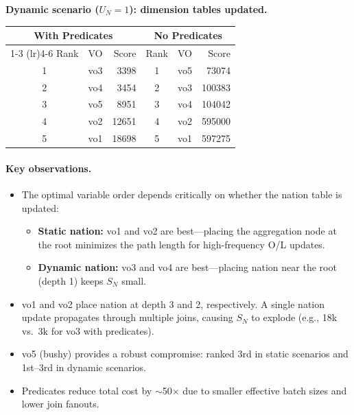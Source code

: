 \smallskip
\noindent\textbf{Dynamic scenario ($U_N = 1$): dimension tables updated.}
\begin{center}
\begin{tabular}{clrclr}
\toprule
\multicolumn{3}{c}{With Predicates} & \multicolumn{3}{c}{No Predicates} \\
\cmidrule(lr){1-3} \cmidrule(lr){4-6}
Rank & VO & Score & Rank & VO & Score \\
\midrule
1 & vo3 & 3398 & 1 & vo5 & 73074 \\
2 & vo4 & 3454 & 2 & vo3 & 100383 \\
3 & vo5 & 8951 & 3 & vo4 & 104042 \\
4 & vo2 & 12651 & 4 & vo2 & 595000 \\
5 & vo1 & 18698 & 5 & vo1 & 597275 \\
\bottomrule
\end{tabular}
\end{center}

\paragraph{Key observations.}
\begin{itemize}
\item The optimal variable order depends critically on whether the nation table is updated:
  \begin{itemize}
  \item \textbf{Static nation:} vo1 and vo2 are best---placing the aggregation node at the root minimizes the path length for high-frequency O/L updates.
  \item \textbf{Dynamic nation:} vo3 and vo4 are best---placing nation near the root (depth 1) keeps $S_N$ small.
  \end{itemize}
\item vo1 and vo2 place nation at depth 3 and 2, respectively. A single nation update propagates through multiple joins, causing $S_N$ to explode (e.g., 18k vs.\ 3k for vo3 with predicates).
\item vo5 (bushy) provides a robust compromise: ranked 3rd in static scenarios and 1st--3rd in dynamic scenarios.
\item Predicates reduce total cost by $\sim$50$\times$ due to smaller effective batch sizes and lower join fanouts.
\end{itemize}
